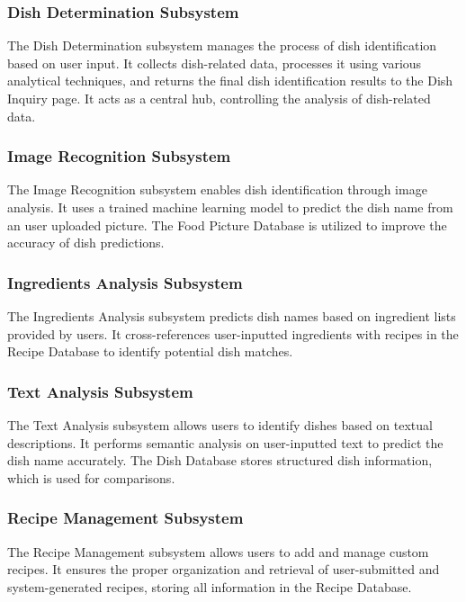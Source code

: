 \documentclass[]{article}
\begin{document}
\subsubsection{Dish Determination Subsystem}
The Dish Determination subsystem manages the process of dish identification based on user input. It collects dish-related data, processes it using various analytical techniques, and returns the final dish identification results to the Dish Inquiry page. It acts as a central hub, controlling the analysis of dish-related data.


\subsubsection{Image Recognition Subsystem}
The Image Recognition subsystem enables dish identification through image analysis. It uses a trained machine learning model to predict the dish name from an user uploaded picture. The Food Picture Database is utilized to improve the accuracy of dish predictions.


\subsubsection{Ingredients Analysis Subsystem}
The Ingredients Analysis subsystem predicts dish names based on ingredient lists provided by users. It cross-references user-inputted ingredients with recipes in the Recipe Database to identify potential dish matches.


\subsubsection{Text Analysis Subsystem}
The Text Analysis subsystem allows users to identify dishes based on textual descriptions. It performs semantic analysis on user-inputted text to predict the dish name accurately. The Dish Database stores structured dish information, which is used for comparisons.


\subsubsection{Recipe Management Subsystem}
The Recipe Management subsystem allows users to add and manage custom recipes. It ensures the proper organization and retrieval of user-submitted and system-generated recipes, storing all information in the Recipe Database.


	
\end{document}
